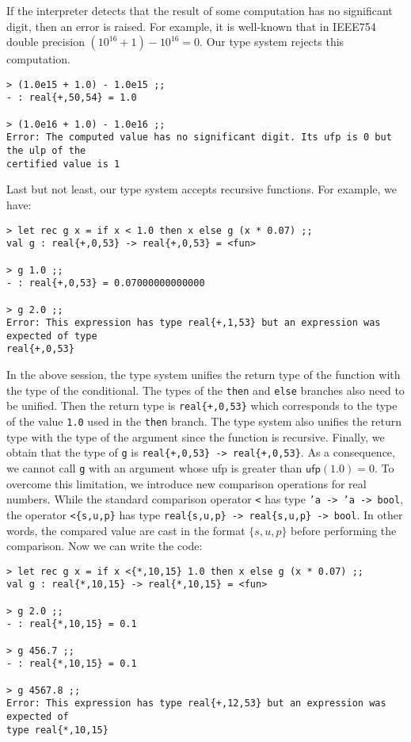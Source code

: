 If the interpreter detects that the result of some computation has no significant digit, then an error is raised. For example, it is well-known that
in IEEE754 double precision $(10^{16} + 1)-10^{16}=0$. Our type system rejects this computation.
\begin{verbatim}
> (1.0e15 + 1.0) - 1.0e15 ;;
- : real{+,50,54} = 1.0 

> (1.0e16 + 1.0) - 1.0e16 ;;
Error: The computed value has no significant digit. Its ufp is 0 but the ulp of the 
certified value is 1 
\end{verbatim}

Last but not least, our type system accepts recursive functions. For example, we have:
\begin{verbatim}
> let rec g x = if x < 1.0 then x else g (x * 0.07) ;;
val g : real{+,0,53} -> real{+,0,53} = <fun>

> g 1.0 ;;
- : real{+,0,53} = 0.07000000000000

> g 2.0 ;;
Error: This expression has type real{+,1,53} but an expression was expected of type
real{+,0,53}
\end{verbatim}

In the above session, the type system unifies the return type of the function with the
type of the conditional. The types of the \texttt{then} and \texttt{else} branches also need to be unified.
Then the return type is \texttt{real\{+,0,53\}} which corresponds to the type of the
value \texttt{1.0} used in the \texttt{then} branch. The type system also unifies the return
type with the type of the argument since the function is recursive. Finally, we obtain that the type
of \texttt{g} is \texttt{real\{+,0,53\} -> real\{+,0,53\}}.
As a consequence, we cannot call \texttt{g}  with an argument whose \textsf{ufp} is greater
than $\mathsf{ufp}(1.0)=0$.
To overcome this limitation, we introduce new comparison operations for real numbers. While
the standard comparison operator \texttt{<} has type \texttt{'a -> 'a -> bool},
the operator \texttt{<\{s,u,p\}} has type \texttt{real\{s,u,p\} -> real\{s,u,p\} -> bool}.
In other words, the compared value are cast in the format $\{s,u,p\}$ before performing the
comparison. Now we can write the code:
\begin{verbatim}
> let rec g x = if x <{*,10,15} 1.0 then x else g (x * 0.07) ;;
val g : real{*,10,15} -> real{*,10,15} = <fun>

> g 2.0 ;;
- : real{*,10,15} = 0.1

> g 456.7 ;;
- : real{*,10,15} = 0.1

> g 4567.8 ;;
Error: This expression has type real{+,12,53} but an expression was expected of 
type real{*,10,15}
\end{verbatim}

